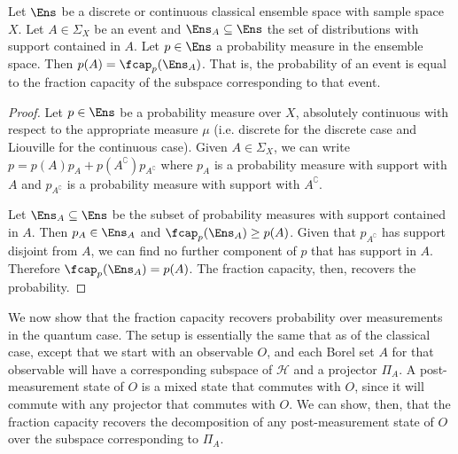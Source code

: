 \begin{mathSection}
	\begin{prop}
		Let $\Ens$ be a discrete or continuous classical ensemble space with sample space $X$. Let $A \in \Sigma_X$ be an event and $\Ens_A \subseteq \Ens$ the set of distributions with support contained in $A$. Let $p \in \Ens$ a probability measure in the ensemble space. Then $p(A) = \fcap_{p}(\Ens_A)$. That is, the probability of an event is equal to the fraction capacity of the subspace corresponding to that event.
	\end{prop}
	\begin{proof}
		Let $p \in \Ens$ be a probability measure over $X$, absolutely continuous with respect to the appropriate measure $\mu$ (i.e. discrete for the discrete case and Liouville for the continuous case). Given $A \in \Sigma_X$, we can write $p = p(A) p_A + p(A^{\complement}) p_{A^{\complement}}$ where  $p_A$ is a probability measure with support with $A$ and $p_{A^{\complement}}$ is a probability measure with support with $A^{\complement}$.
		
		Let $\Ens_A \subseteq \Ens$ be the subset of probability measures with support contained in $A$. Then $p_A \in \Ens_A$ and $\fcap_{p}(\Ens_A) \geq p(A)$. Given that $p_{A^{\complement}}$ has support disjoint from $A$, we can find no further component of $p$ that has support in $A$. Therefore $\fcap_{p}(\Ens_A) = p(A)$. The fraction capacity, then, recovers the probability.
	\end{proof}
\end{mathSection}
	
We now show that the fraction capacity recovers probability over measurements in the quantum case. The setup is essentially the same that as of the classical case, except that we start with an observable $O$, and each Borel set $A$ for that observable will have a corresponding subspace of $\mathcal{H}$ and a projector $\Pi_A$. A post-measurement state of $O$ is a mixed state that commutes with $O$, since it will commute with any projector that commutes with $O$. We can show, then, that the fraction capacity recovers the decomposition of any post-measurement state of $O$ over the subspace corresponding to $\Pi_A$.

